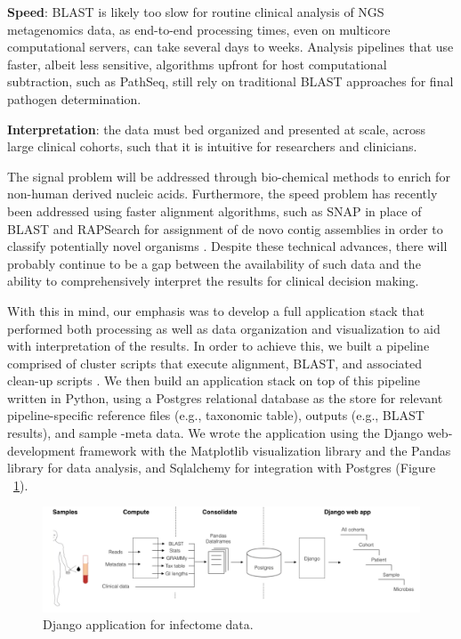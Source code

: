 \textbf{Speed}: BLAST is likely too slow for routine clinical analysis of NGS metagenomics data, as end-to-end processing times, even on multicore computational servers, can take several days to weeks.  Analysis pipelines that use faster, albeit less sensitive, algorithms upfront for host computational subtraction, such as PathSeq, still rely on traditional BLAST approaches for final pathogen determination.  

\textbf{Interpretation}: the data must bed organized and presented at scale, across large clinical cohorts, such that it is intuitive for researchers and clinicians.

The signal problem will be addressed through bio-chemical methods to enrich for non-human derived nucleic acids. Furthermore, the speed problem has recently been addressed using faster alignment algorithms, such as SNAP in place of BLAST and RAPSearch for assignment of de novo contig assemblies in order to classify potentially novel organisms \cite{Naccache:2014gk}. Despite these technical advances, there will probably continue to be a gap between the availability of such data and the ability to comprehensively interpret the results for clinical decision making. 

With this in mind, our emphasis was to develop a full application stack that performed both processing as well as data organization and visualization to aid with interpretation of the results. In order to achieve this, we built a pipeline comprised of cluster scripts that execute alignment, BLAST, and associated clean-up scripts \cite{Xia:2011it}. We then build an application stack on top of this pipeline written in Python, using a Postgres relational database as the store for relevant pipeline-specific reference files (e.g., taxonomic table), outputs (e.g., BLAST results), and sample -meta data. We wrote the application using the Django web-development framework with the Matplotlib visualization library \cite{Hunter:2007ux} and the Pandas library for data analysis, and Sqlalchemy for integration with Postgres (Figure ~\ref{fig:Fig4}).

\begin{figure}
\center\includegraphics[width=150mm,scale=0.5]{Figures/Fig4}
\caption{Django application for infectome data.}
\label{fig:Fig4}
\end{figure}

